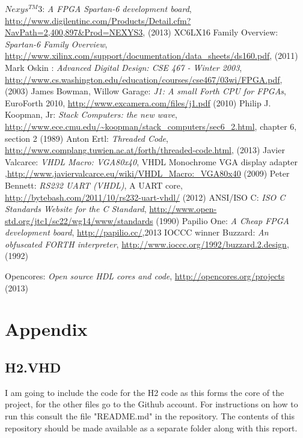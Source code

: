\documentclass	[a4paper, 10pt]	{article}
\begin{document}
    \begin{thebibliography}{1}              %
     $Nexys^{TM}$3: \emph{A FPGA Spartan-6 development board}, \url{http://www.digilentinc.com/Products/Detail.cfm?NavPath=2,400,897\&Prod=NEXYS3}, (2013)
     XC6LX16 Family Overview: \emph{Spartan-6 Family Overview}, \url{http://www.xilinx.com/support/documentation/data_sheets/ds160.pdf}, (2011)
     Mark Oskin : \emph{Advanced Digital Design: CSE 467 - Winter 2003}, \url{http://www.cs.washington.edu/education/courses/cse467/03wi/FPGA.pdf}, (2003)
     James Bowman, Willow Garage: \emph{J1: A small Forth CPU for FPGAs},  EuroForth 2010, \url{http://www.excamera.com/files/j1.pdf} (2010)
     Philip J. Koopman, Jr: \emph{Stack Computers: the new wave}, \url{http://www.ece.cmu.edu/~koopman/stack_computers/sec6_2.html}, chapter 6, section 2 (1989)
     Anton Ertl: \emph{Threaded Code}, \url{http://www.complang.tuwien.ac.at/forth/threaded-code.html}, (2013)
     Javier Valcarce: \emph{VHDL Macro: VGA80x40}, VHDL Monochrome VGA display adapter ,\url{http://www.javiervalcarce.eu/wiki/VHDL_Macro:_VGA80x40} (2009)
     Peter Bennett: \emph{RS232 UART (VHDL)}, A UART core, \url{http://bytebash.com/2011/10/rs232-uart-vhdl/} (2012)
     ANSI/ISO C: \emph{ISO C Standards Website for the C Standard}, \url{http://www.open-std.org/jtc1/sc22/wg14/www/standards} (1990)
     Papilio One: \emph{A Cheap FPGA development board}, \url{http://papilio.cc/},2013
     IOCCC winner Buzzard: \emph{An obfuscated FORTH interpreter}, \url{http://www.ioccc.org/1992/buzzard.2.design}, (1992)

     Opencores: \emph{Open source HDL cores and code}, \url{http://opencores.org/projects} (2013)

    \end{thebibliography}



  \section{Appendix}

  \subsection{H2.VHD}
  I am going to include the code for the H2 code as this forms the core of the project, for
  the other files go to the Github account. For instructions on how to run this consult the
  file "README.md" in the repository. The contents of this repository should be made available
  as a separate folder along with this report.
\end{document}
